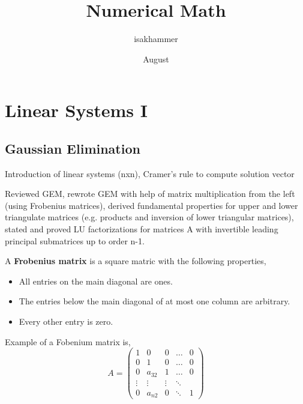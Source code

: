 \documentclass{article}
\title{Numerical Math}
\author{isakhammer }
\date{August}
\theoremstyle{remark}
\begin{document}
\maketitle
\tableofcontents
\newpage

\newpage
\section{Linear Systems I}%
\label{sec:linear_systems_i}
\subsection{Gaussian Elimination}%
\label{sub:gaussian_elimination}
\begin{tcolorbox}
  Introduction of linear systems (nxn), Cramer's rule to compute solution vector
\end{tcolorbox}



 \begin{tcolorbox}
   Reviewed GEM, rewrote GEM with help of matrix multiplication from the left (using Frobenius matrices), derived fundamental properties for upper and lower triangulate matrices (e.g. products and inversion of lower triangular matrices), stated and proved LU factorizations for matrices A with invertible leading principal submatrices up to order n-1.
 \end{tcolorbox}

 \begin{definition}
   A \textbf{Frobenius matrix}  is a square matric with the following properties,
   \begin{itemize}
     \item All entries on the main diagonal are ones.
     \item The entries below the main diagonal of at most one column are arbitrary.
     \item Every other entry is zero.
   \end{itemize}
 \end{definition}

 Example of a Fobenium matrix is,
 \[
   A = 
   \begin{pmatrix}
     1 & 0 & 0 & \ldots & 0 \\
     0 & 1 & 0 & \ldots & 0 \\
     0 & a_{32} & 1 & \ldots & 0 \\
     \vdots & \vdots & \vdots  & \ddots \\
     0  & a_{n 2}  & 0  & \ddots  &  1
   \end{pmatrix} 
 \] 
\end{document}
